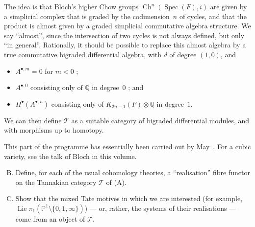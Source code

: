 \documentclass{article}
\theoremstyle{plain}
\theoremstyle{definition}
\newcommand{\scr}[1]{{\mathscr{#1}}}
\newcommand{\QQ}{\mathbb{Q}}
\newcommand{\PP}{\mathbb{P}}
\DeclareMathOperator{\Lie}{Lie}
\DeclareMathOperator{\Spec}{Spec}
\DeclareMathOperator{\Ch}{Ch}
\begin{document}
The idea is that Bloch's higher Chow groups $\Ch^n(\Spec(F),i)$ are given by a simplicial complex that is graded by the codimension~$n$ of cycles, and that the product is almost given by a graded simplicial commutative algebra structure.
We say ``almost'', since the intersection of two cycles is not always defined, but only ``in general''.
Rationally, it should be possible to replace this almost algebra by a true commutative bigraded differential algebra, with $d$ of degree $(1,0)$, and
\begin{itemize}
  \item $A^{\bullet,m}=0$ for $m<0$ ;
  \item $A^{\bullet,0}$ consisting only of $\QQ$ in degree~$0$ ; and
  \item $H^\bullet(A^{\bullet,n})$ consisting only of $K_{2n-1}(F)\otimes\QQ$ in degree~$1$.
\end{itemize}
We can then define $\scr{T}$ as a suitable category of bigraded differential modules, and with morphisms up to homotopy.

This part of the programme has essentially been carried out by May~\cite{26}.
For a cubic variety, see the talk of Bloch in this volume.

\begin{enumerate}[(A)]
\setcounter{enumi}{1}
  \item Define, for each of the usual cohomology theories, a ``realisation'' fibre functor on the Tannakian category $\scr{T}$ of (A).
  \item Show that the mixed Tate motives in which we are interested (for example, $\Lie\pi_1(\PP^1\setminus\{0,1,\infty\})$) --- or, rather, the systems of their realisations --- come from an object of $\scr{T}$.
\end{enumerate}



\nocite{*}
\end{document}

